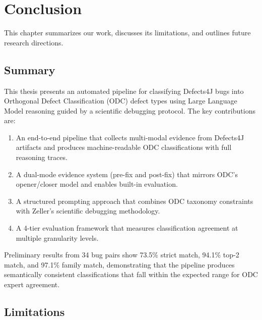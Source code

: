 \documentclass{iutbscthesis}
\begin{document}


\chapter{Conclusion}

This chapter summarizes our work, discusses its limitations, and outlines future research directions.

\section{Summary}

This thesis presents an automated pipeline for classifying Defects4J bugs into Orthogonal Defect Classification (ODC) defect types using Large Language Model reasoning guided by a scientific debugging protocol. The key contributions are:

\begin{enumerate}
    \item An end-to-end pipeline that collects multi-modal evidence from Defects4J artifacts and produces machine-readable ODC classifications with full reasoning traces.
    \item A dual-mode evidence system (pre-fix and post-fix) that mirrors ODC's opener/closer model and enables built-in evaluation.
    \item A structured prompting approach that combines ODC taxonomy constraints with Zeller's scientific debugging methodology.
    \item A 4-tier evaluation framework that measures classification agreement at multiple granularity levels.
\end{enumerate}

Preliminary results from 34 bug pairs show 73.5\% strict match, 94.1\% top-2 match, and 97.1\% family match, demonstrating that the pipeline produces semantically consistent classifications that fall within the expected range for ODC expert agreement.

\section{Limitations}
\end{document}
